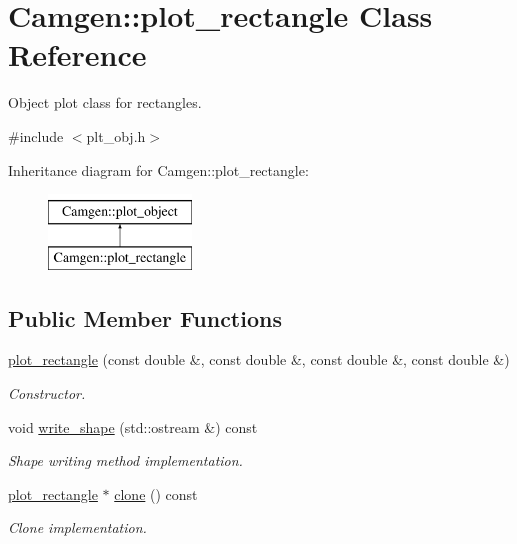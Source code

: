 \hypertarget{a00425}{\section{Camgen\-:\-:plot\-\_\-rectangle Class Reference}
\label{a00425}
}


Object plot class for rectangles.  




{\ttfamily \#include $<$plt\-\_\-obj.\-h$>$}

Inheritance diagram for Camgen\-:\-:plot\-\_\-rectangle\-:\begin{figure}[H]
\begin{center}
\leavevmode
\includegraphics[height=2.000000cm]{a00425}
\end{center}
\end{figure}
\subsection*{Public Member Functions}
\begin{DoxyCompactItemize}
\item 
\hypertarget{a00425_a56b4c84ca0e11210e4cf3bad7e22f050}{\hyperlink{a00425_a56b4c84ca0e11210e4cf3bad7e22f050}{plot\-\_\-rectangle} (const double \&, const double \&, const double \&, const double \&)}\label{a00425_a56b4c84ca0e11210e4cf3bad7e22f050}

\begin{DoxyCompactList}\small\item\em Constructor. \end{DoxyCompactList}\item 
\hypertarget{a00425_a411bbec508761cba564ea6a5a4cd376a}{void \hyperlink{a00425_a411bbec508761cba564ea6a5a4cd376a}{write\-\_\-shape} (std\-::ostream \&) const }\label{a00425_a411bbec508761cba564ea6a5a4cd376a}

\begin{DoxyCompactList}\small\item\em Shape writing method implementation. \end{DoxyCompactList}\item 
\hypertarget{a00425_a828a04953b60d16b124d6654d8b2164a}{\hyperlink{a00425}{plot\-\_\-rectangle} $\ast$ \hyperlink{a00425_a828a04953b60d16b124d6654d8b2164a}{clone} () const }\label{a00425_a828a04953b60d16b124d6654d8b2164a}

\begin{DoxyCompactList}\small\item\em Clone implementation. \end{DoxyCompactList}\end{DoxyCompactItemize}
